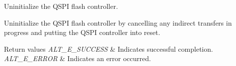 Uninitialize the Q\+S\+PI flash controller.

Uninitialize the Q\+S\+PI flash controller by cancelling any indirect transfers in progress and putting the Q\+S\+PI controller into reset.


\begin{DoxyRetVals}{Return values}
{\em A\+L\+T\+\_\+\+E\+\_\+\+S\+U\+C\+C\+E\+SS} & Indicates successful completion. \\
\hline
{\em A\+L\+T\+\_\+\+E\+\_\+\+E\+R\+R\+OR} & Indicates an error occurred. \\
\hline
\end{DoxyRetVals}
